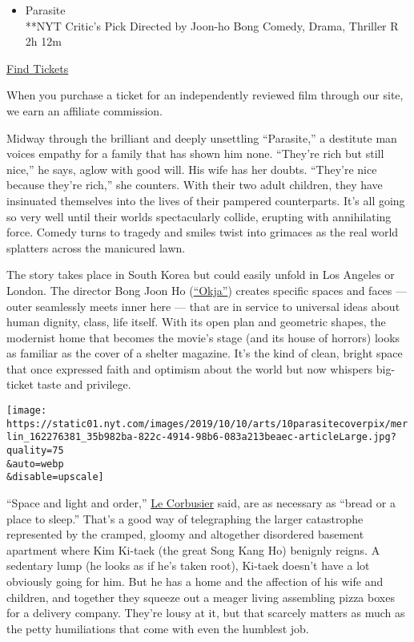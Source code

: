 \begin{itemize}
\tightlist
\item
  Parasite\\
  **NYT Critic's Pick Directed by Joon-ho Bong Comedy, Drama, Thriller R
  2h 12m
\end{itemize}

\href{https://www.imdb.com/showtimes/title/tt6751668?ref_=ref_ext_NYT}{Find
Tickets}

When you purchase a ticket for an independently reviewed film through
our site, we earn an affiliate commission.

Midway through the brilliant and deeply unsettling ``Parasite,'' a
destitute man voices empathy for a family that has shown him none.
``They're rich but still nice,'' he says, aglow with good will. His wife
has her doubts. ``They're nice because they're rich,'' she counters.
With their two adult children, they have insinuated themselves into the
lives of their pampered counterparts. It's all going so very well until
their worlds spectacularly collide, erupting with annihilating force.
Comedy turns to tragedy and smiles twist into grimaces as the real world
splatters across the manicured lawn.

The story takes place in South Korea but could easily unfold in Los
Angeles or London. The director Bong Joon Ho
(\href{https://www.nytimes.com/2017/06/27/movies/review-okja-bong-joon-ho.html}{``Okja''})
creates specific spaces and faces --- outer seamlessly meets inner here
--- that are in service to universal ideas about human dignity, class,
life itself. With its open plan and geometric shapes, the modernist home
that becomes the movie's stage (and its house of horrors) looks as
familiar as the cover of a shelter magazine. It's the kind of clean,
bright space that once expressed faith and optimism about the world but
now whispers big-ticket taste and privilege.

\texttt{[image: https://static01.nyt.com/images/2019/10/10/arts/10parasitecoverpix/merlin\_162276381\_35b982ba-822c-4914-98b6-083a213beaec-articleLarge.jpg?quality=75\\\&auto=webp\\\&disable=upscale]}

``Space and light and order,''
\href{https://www.nytimes.com/topic/person/le-corbusier}{Le Corbusier}
said, are as necessary as ``bread or a place to sleep.'' That's a good
way of telegraphing the larger catastrophe represented by the cramped,
gloomy and altogether disordered basement apartment where Kim Ki-taek
(the great Song Kang Ho) benignly reigns. A sedentary lump (he looks as
if he's taken root), Ki-taek doesn't have a lot obviously going for him.
But he has a home and the affection of his wife and children, and
together they squeeze out a meager living assembling pizza boxes for a
delivery company. They're lousy at it, but that scarcely matters as much
as the petty humiliations that come with even the humblest job.

